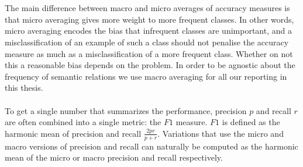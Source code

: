 \\\\
The main difference between macro and micro averages of accuracy measures is that micro averaging gives more weight to more frequent classes. In other words, micro averaging encodes the bias that infrequent classes are unimportant, and a misclassification of an example of such a class should not penalise the accuracy measure as much as a misclassification of a more frequent class. Whether on not this a reasonable bias depends on the problem. In order to be agnostic about the frequency of semantic relations we use macro averaging for all our reporting in this thesis.
\\\\
To get a single number that summarizes the performance, precision $p$ and recall $r$ are often combined into a single metric: the $F1$ measure. $F1$ is defined as the harmonic mean of precision and recall $\frac{2pr}{p + r}$. Variations that use the micro and macro versions of precision and recall can naturally be computed as the harmonic mean of the micro or macro precision and recall respectively.